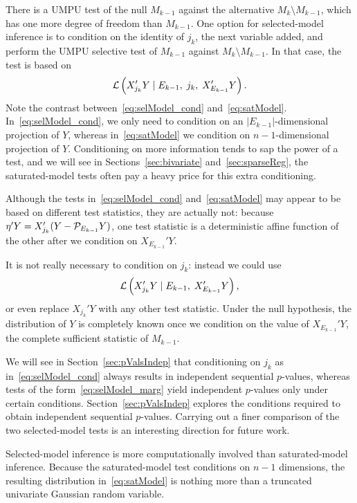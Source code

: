 \documentclass{article}
\begin{document}
There is a UMPU test of the null $M_{k-1}$ against the alternative $M_{k}\setminus M_{k-1}$, which has one more degree of freedom than $M_{k-1}$. One option for selected-model inference is to condition on the identity of $j_k$, the next variable added, and perform the UMPU selective test of $M_{k-1}$ against $M_{k}\setminus M_{k-1}$. In that case, the test is based on
\begin{equation}\label{eq:selModel_cond}
\mathcal{L}\left(X_{j_k}'Y \mid E_{k-1}, \; j_k, \; X_{E_{k-1}}'Y\right).
\end{equation}
Note the contrast between~\eqref{eq:selModel_cond} and~\eqref{eq:satModel}. In~\eqref{eq:selModel_cond}, we only need to condition on an $|E_{k-1}|$-dimensional projection of $Y$, whereas in~\eqref{eq:satModel} we condition on $n-1$-dimensional projection of $Y$. Conditioning on more information tends to sap the power of a test, and we will see in Sections~\ref{sec:bivariate} and~\ref{sec:sparseReg}, the saturated-model tests often pay a heavy price for this extra conditioning.

Although the tests in~\eqref{eq:selModel_cond} and~\eqref{eq:satModel} may appear to be based on different test statistics, they are actually not: because $\eta'Y = X_{j_k}'(Y - \mathcal{P}_{E_{k-1}}Y)$, one test statistic is a deterministic affine function of the other after we condition on $X_{E_{k-1}}'Y$.

It is not really necessary to condition on $j_k$: instead we could use
\begin{equation}\label{eq:selModel_marg}
\mathcal{L}\left(X_{j_k}'Y \mid E_{k-1}, \; X_{E_{k-1}}'Y\right),
\end{equation}
or even replace $X_{j_k}'Y$ with any other test statistic. Under the null hypothesis, the distribution of $Y$ is completely known once we condition on the value of $X_{E_{k-1}}'Y$, the complete sufficient statistic of $M_{k-1}$.

We will see in Section~\ref{sec:pValsIndep} that conditioning on $j_k$ as in~\eqref{eq:selModel_cond} always results in independent sequential $p$-values, whereas tests of the form~\eqref{eq:selModel_marg} yield independent $p$-values only under certain conditions. Section~\ref{sec:pValsIndep} explores the conditions required to obtain independent sequential $p$-values. Carrying out a finer comparison of the two selected-model tests is an interesting direction for future work.

Selected-model inference is more computationally involved than saturated-model inference. Because the saturated-model test conditions on $n-1$ dimensions, the resulting distribution in~\eqref{eq:satModel} is nothing more than a truncated univariate Gaussian random variable.
\end{document}
